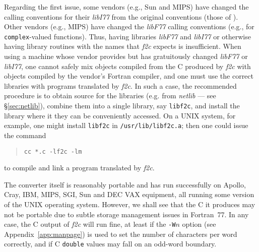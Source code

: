 \documentclass[10pt,a4paper]{article}
\begin{document}
Regarding the first issue, some vendors (e.g., Sun and MIPS) have changed the calling conventions for their \emph{libI77} from the original conventions (those of \citep{6}). Other vendors (e.g., MIPS) have changed the \emph{libF77} calling conventions (e.g., for \verb|complex|-valued functions). Thus, having libraries \emph{libF77} and \emph{libI77} or otherwise having library routines with the names that \emph{f2c} expects is insufficient. When using a machine whose vendor provides but has gratuitously changed \emph{libF77} or \emph{libI77}, one cannot safely mix objects compiled from the C produced by \emph{f2c} with objects compiled by the vendor’s Fortran compiler, and one must use the correct libraries with programs translated by \emph{f2c}. In such a case, the recommended procedure is to obtain source for the libraries (e.g. from \emph{netlib} --- see §\ref{sec:netlib}), combine them into a single library, say \verb|libf2c|, and install the library where it they can be conveniently accessed. On a UNIX system, for example, one might install \verb|libf2c| in \verb|/usr/lib/libf2c.a|; then one could issue the command
\begin{quote}
\begin{verbatim}
cc *.c -lf2c -lm
\end{verbatim}
\end{quote}
to compile and link a program translated by \emph{f2c}.

The converter itself is reasonably portable and has run successfully on Apollo, Cray, IBM, MIPS, SGI, Sun and DEC VAX equipment, all running some version of the UNIX operating system. However, we shall see that the C it produces may not be portable due to subtle storage management issues in Fortran~77. In any case, the C output of \emph{f2c} will run fine, at least if the \verb|-W|$n$ option (see Appendix~\ref{app:manpage}) is used to set the number of characters per word correctly, and if C \verb|double| values may fall on an odd-word boundary.
\end{document}
